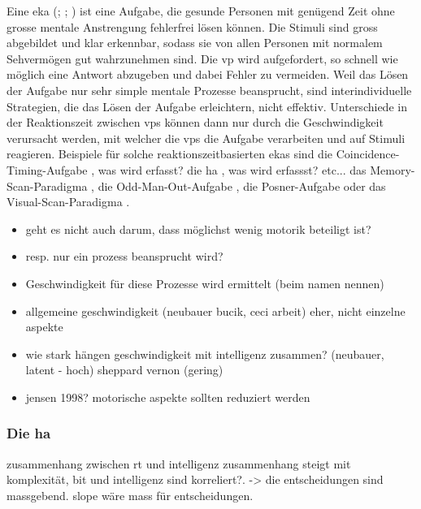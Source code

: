 \documentclass[11pt, twoside, a4paper]{book}		%
\begin{document}
Eine \gls{eka} (\citealp[S. 290]{Anderson2001}; \citealp[S. 11]{Carroll1993}; \citealp[S. 207--209]{Jensen2006}) ist eine Aufgabe, die gesunde Personen mit genügend Zeit ohne grosse mentale Anstrengung fehlerfrei lösen können. Die Stimuli sind gross abgebildet und klar erkennbar, sodass sie von allen Personen mit normalem Sehvermögen gut wahrzunehmen sind. Die \gls{vp} wird aufgefordert, so schnell wie möglich eine Antwort abzugeben und dabei Fehler zu vermeiden. Weil das Lösen der Aufgabe nur sehr simple mentale Prozesse beansprucht, sind interindividuelle Strategien, die das Lösen der Aufgabe erleichtern, nicht effektiv. Unterschiede in der Reaktionszeit zwischen \glspl{vp} können dann nur durch die Geschwindigkeit verursacht werden, mit welcher die \glspl{vp} die Aufgabe verarbeiten und auf Stimuli reagieren.
Beispiele für solche reaktionszeitbasierten \glspl{eka} sind
die Coincidence-Timing-Aufgabe \citep{Smith1987}, was wird erfasst?
die \gls{ha} \citep{Hick1952}, was wird erfassst? etc...
das Memory-Scan-Paradigma \citep{Sternberg1966, Sternberg1969},
die Odd-Man-Out-Aufgabe \citep{Frearson1986}, 
die Posner-Aufgabe \citep{Posner1969}
oder das Visual-Scan-Paradigma \citep[][S. 66--71]{Neisser1967}.

\begin{itemize}
	\item geht es nicht auch darum, dass möglichst wenig motorik beteiligt ist?
	\item resp. nur ein prozess beansprucht wird?
	\item Geschwindigkeit für diese Prozesse wird ermittelt (beim namen nennen)
	\item allgemeine geschwindigkeit (neubauer bucik, ceci arbeit) eher, nicht einzelne aspekte
	\item wie stark hängen geschwindigkeit mit intelligenz zusammen? (neubauer, latent - hoch) sheppard vernon (gering)
	\item jensen 1998? motorische aspekte sollten reduziert werden
\end{itemize}



\subsubsection*{Die \gls{ha}}

zusammenhang zwischen rt und intelligenz
zusammenhang steigt mit komplexität, bit und intelligenz sind korreliert?. -> die entscheidungen sind massgebend. slope wäre mass für entscheidungen.
\end{document}
